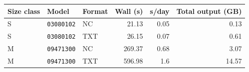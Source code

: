 \begin{tabular*}{\textwidth}{@{\extracolsep{\fill}}lllrrr@{}}
\toprule
Size class & Model & Format & Wall (s) & s/day & Total output (GB) \\
\midrule
S & \texttt{03080102} & NC & 21.13 & 0.05 & 0.13 \\
S & \texttt{03080102} & TXT & 26.15 & 0.07 & 0.61 \\
M & \texttt{09471300} & NC & 269.37 & 0.68 & 3.07 \\
M & \texttt{09471300} & TXT & 596.98 & 1.6 & 14.57 \\
\bottomrule
\end{tabular*}
